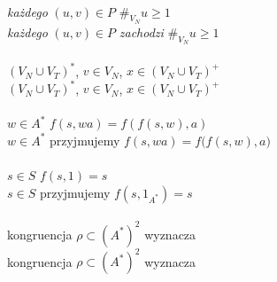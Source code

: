 \documentclass[a4paper,11pt]{article}
\begin{document}
 \\
\Jest  \textit{każdego}{ }{ }$( u, v ) \in P${ }{ } $\#_{ V_{ N } } u \geq 1$ \\
\Powin \textit{każdego} $( u, v ) \in P$ \textit{zachodzi}
$\#_{ V_{ N } } u \geq 1$ \\
 \\
\Jest  $( V_{ N } \cup V_{ T } )^{ * }$,{ } $v \in V_{ N }$,{ }
$x \in ( V_{ N } \cup V_{ T } )^{ + }$ \\
\Powin $( V_{ N } \cup V_{ T } )^{ * }$, $v \in V_{ N }$,
$x \in ( V_{ N } \cup V_{ T } )^{ + }$ \\
 \\
\Jest  $w \in A^{ * }${ } $f( s, wa ) = f( f( s, w ), a )$ \\
\Powin $w \in A^{ * }$ przyjmujemy $f( s, wa ) = f\big( f( s, w ), a \big)$ \\
 \\
\Jest  $s \in S${ } $f( s, 1 ) = s$ \\
\Powin $s \in S$ przyjmujemy $f( s, 1_{ A^{ * } } ) = s$ \\
 \\
\Jest  kongruencja{ }{ } $\rho \subset ( A^{ * } )^{ 2 }${ }{ } wyznacza \\
\Powin kongruencja $\rho \subset ( A^{ * } )^{ 2 }$ wyznacza \\




















{}






\end{document}
